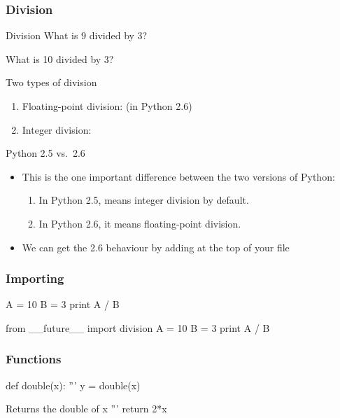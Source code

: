 \begin{frame}[fragile]
\frametitle{Division}
\begin{block}{Division}
What is 9 divided by 3?

What is 10 divided by 3?
\end{block}

\begin{block}{Two types of division}
\begin{enumerate}
\item Floating-point division:  (in Python 2.6)
\item Integer division: 
\end{enumerate}
\end{block}

\begin{block}{Python 2.5 vs.\ 2.6}
\begin{itemize}
\item This is the one important difference between the two versions of Python:
\begin{enumerate}
\item In Python 2.5,  means \alert{integer division} by default.
\item In Python 2.6, it means \alert{floating-point division}.
\end{enumerate}
\item We can get the 2.6 behaviour by adding  at the top of your file
\end{itemize}
\end{block}
\end{frame}

\begin{frame}[fragile]
\frametitle{Importing}

\begin{python}
A = 10
B = 3
print A / B
\end{python}

\begin{python}
from __future__ import division
A = 10
B = 3
print A / B
\end{python}
\end{frame}


\begin{frame}[fragile]
\frametitle{Functions}
\begin{python}
def double(x):
    '''
    y = double(x)

    Returns the double of x
    '''
    return 2*x
\end{python}
\end{frame}

